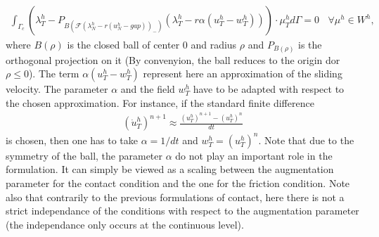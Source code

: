 \documentclass[a4paper,11pt,english]{sphinxmanual}
\begin{document}
\begin{equation*}
\begin{split}\displaystyle \int_{\Gamma_c} (\lambda^h_T -P_{B(\mathscr F(\lambda^h_N - r(u^h_N-gap))_-)}(\lambda^h_T - r\alpha(u^h_T-w^h_T)))\cdot \mu^h_T d\Gamma = 0 ~~~~ \forall \mu^h \in W^h,\end{split}
\end{equation*}
where \(B(\rho)\) is the closed ball of center  \(0\) and radius \(\rho\) and \(P_{B(\rho)}\) is the orthogonal projection on it (By convenyion, the ball reduces to the origin dor \(\rho \le 0\)). The term \(\alpha(u^h_T-w^h_T)\) represent here an approximation of the sliding velocity. The parameter \(\alpha\) and the field \(w^h_T\) have to be adapted with respect to the chosen approximation. For instance, if the standard finite difference
\begin{equation*}
\begin{split}(\dot{u}^h_T)^{n+1} \approx \displaystyle \frac{(u^h_T)^{n+1} - (u^h_T)^{n}}{dt}\end{split}
\end{equation*}
is chosen, then one has to take \(\alpha = 1/dt\) and \(w^h_T = (u^h_T)^{n}\). Note that due to the symmetry of the ball, the parameter \(\alpha\) do not play an important role in the formulation. It can simply be viewed as a scaling between the augmentation parameter for the contact condition and the one for the friction condition. Note also that contrarily to the previous formulations of contact, here there is not a strict independance of the conditions with respect to the augmentation parameter (the independance only occurs at the continuous level).
\end{document}
